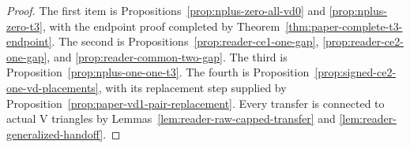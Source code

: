 \begin{proof}
The first item is Propositions~\ref{prop:nplus-zero-all-vd0} and
\ref{prop:nplus-zero-t3}, with the endpoint proof completed by
Theorem~\ref{thm:paper-complete-t3-endpoint}.  The second is
Propositions~\ref{prop:reader-ce1-one-gap},
\ref{prop:reader-ce2-one-gap}, and
\ref{prop:reader-common-two-gap}.  The third is
Proposition~\ref{prop:nplus-one-one-t3}.  The fourth is
Proposition~\ref{prop:signed-ce2-one-vd-placements}, with its replacement step
supplied by Proposition~\ref{prop:paper-vd1-pair-replacement}.  Every transfer
is connected to actual V triangles by Lemmas~\ref{lem:reader-raw-capped-transfer} and
\ref{lem:reader-generalized-handoff}.
\end{proof}
